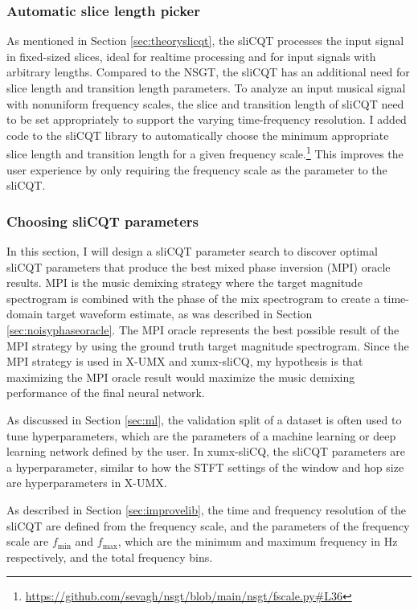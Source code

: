 \documentclass[report.tex]{subfiles}
\begin{document}
\subsubsection{Automatic slice length picker}
\label{sec:sllenpicker}

As mentioned in Section \ref{sec:theoryslicqt}, the sliCQT processes the input signal in fixed-sized slices, ideal for realtime processing and for input signals with arbitrary lengths. Compared to the NSGT, the sliCQT has an additional need for slice length and transition length parameters. To analyze an input musical signal with nonuniform frequency scales, the slice and transition length of sliCQT need to be set appropriately to support the varying time-frequency resolution. I added code to the sliCQT library to automatically choose the minimum appropriate slice length and transition length for a given frequency scale.\footnote{\url{https://github.com/sevagh/nsgt/blob/main/nsgt/fscale.py\#L36}} This improves the user experience by only requiring the frequency scale as the parameter to the sliCQT.

\subsubsection{Choosing sliCQT parameters}
\label{sec:slicqparamsrch}

In this section, I will design a sliCQT parameter search to discover optimal sliCQT parameters that produce the best mixed phase inversion (MPI) oracle results. MPI is the music demixing strategy where the target magnitude spectrogram is combined with the phase of the mix spectrogram to create a time-domain target waveform estimate, as was described in Section \ref{sec:noisyphaseoracle}. The MPI oracle represents the best possible result of the MPI strategy by using the ground truth target magnitude spectrogram. Since the MPI strategy is used in X-UMX and xumx-sliCQ, my hypothesis is that maximizing the MPI oracle result would maximize the music demixing performance of the final neural network.

As discussed in Section \ref{sec:ml}, the validation split of a dataset is often used to tune hyperparameters, which are the parameters of a machine learning or deep learning network defined by the user. In xumx-sliCQ, the sliCQT parameters are a hyperparameter, similar to how the STFT settings of the window and hop size are hyperparameters in X-UMX.

As described in Section \ref{sec:improvelib}, the time and frequency resolution of the sliCQT are defined from the frequency scale, and the parameters of the frequency scale are $f_{\text{min}}$ and $f_{\text{max}}$, which are the minimum and maximum frequency in Hz respectively, and the total frequency bins.
\end{document}
